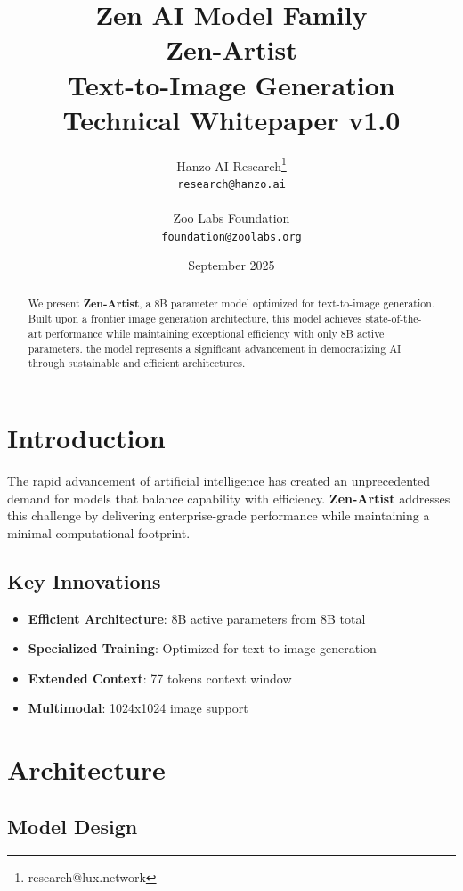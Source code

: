 \documentclass[11pt,a4paper]{article}
\title{
    \vspace{-2cm}
    \Large \textbf{Zen AI Model Family} \\
    \vspace{0.5cm}
    \Huge \textbf{Zen-Artist} \\
    \vspace{0.3cm}
    \large Text-to-Image Generation \\
    \vspace{0.5cm}
    \normalsize Technical Whitepaper v1.0
}
\author{
    Hanzo AI Research\thanks{research@lux.network} \\
    \texttt{research@hanzo.ai} \\
    \\
    Zoo Labs Foundation \\
    \texttt{foundation@zoolabs.org}
}
\date{September 2025}
\begin{document}
\maketitle

\begin{abstract}
We present \textbf{Zen-Artist}, a 8B parameter model optimized for text-to-image generation. 
Built upon a frontier image generation architecture, this model achieves state-of-the-art performance while maintaining exceptional efficiency 
with only 8B active parameters. the model represents a significant advancement in democratizing AI through sustainable and efficient architectures.
\end{abstract}

\tableofcontents
\newpage

\section{Introduction}

The rapid advancement of artificial intelligence has created an unprecedented demand for models that balance capability with efficiency. 
\textbf{Zen-Artist} addresses this challenge by delivering enterprise-grade performance while maintaining a minimal computational footprint.

\subsection{Key Innovations}
\begin{itemize}
    \item \textbf{Efficient Architecture}: 8B active parameters from 8B total
    \item \textbf{Specialized Training}: Optimized for text-to-image generation
    \item \textbf{Extended Context}: 77 tokens context window
\end{itemize}
    
\begin{itemize}
    \item \textbf{Multimodal}: 1024x1024 image support
\end{itemize}
    

\section{Architecture}

\subsection{Model Design}
\end{document}
